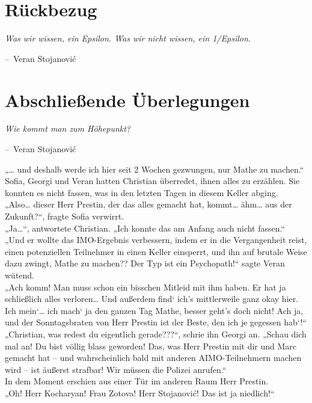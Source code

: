 \documentclass[oneside]{memoir}
\makeatletter
\newenvironment{chapquote}[2][2em]
  {\setlength{\@tempdima}{#1}%
   \def\chapquote@author{#2}%
   \parshape 1 \@tempdima \dimexpr\textwidth-2\@tempdima\relax%
   \itshape}
  {\par\normalfont\hfill--\ \chapquote@author\hspace*{\@tempdima}\par\bigskip}
\makeatother
\begin{document}
\chapter{Rückbezug} %
\begin{chapquote}{Veran Stojanović}
\glqq Was wir wissen, ein Epsilon. Was wir nicht wissen, ein 1/Epsilon.\grqq
\end{chapquote}

\chapter{Abschließende Überlegungen} %
\begin{chapquote}{Veran Stojanović}
\glqq Wie kommt man zum Höhepunkt?\grqq
\end{chapquote}
„\ldots{} und deshalb werde ich hier seit 2 Wochen gezwungen, nur Mathe zu machen.“ \\
Sofia, Georgi und Veran hatten Christian überredet, ihnen alles zu erzählen. Sie konnten es nicht fassen, was in den letzten Tagen in diesem Keller abging. \\
„Also\ldots{} dieser Herr Prestin, der das alles gemacht hat, kommt\ldots{} ähm\ldots{} aus der Zukunft?“, fragte Sofia verwirrt. \\
„Ja\ldots“, antwortete Christian. „Ich konnte das am Anfang auch nicht fassen.“ \\
„Und er wollte das IMO-Ergebnis verbessern, indem er in die Vergangenheit reist, einen potenziellen Teilnehmer in einen Keller einsperrt, und ihn auf brutale Weise dazu zwingt, Mathe zu machen?? Der Typ ist ein Psychopath!“ sagte Veran wütend. \\
„Ach komm! Man muss schon ein bisschen Mitleid mit ihm haben. Er hat ja schließlich alles verloren\ldots{} Und außerdem find‘ ich’s mittlerweile ganz okay hier. Ich mein‘\ldots{} ich mach‘ ja den ganzen Tag Mathe, besser geht’s doch nicht!
Ach ja, und der Sonntagsbraten von Herr Prestin ist der Beste, den ich je gegessen hab‘!“ \\
„Christian, was redest du eigentlich gerade???“, schrie ihn Georgi an. „Schau dich mal an! Du bist völlig blass geworden! Das, was Herr Prestin mit dir und Marc gemacht hat -- und wahrscheinlich bald mit anderen AIMO-Teilnehmern machen wird -- ist äußerst strafbar! Wir müssen die Polizei anrufen.“ \\
In dem Moment erschien aus einer Tür im anderen Raum Herr Prestin. \\
„Oh! Herr Kocharyan! Frau Zotova! Herr Stojanović! Das ist ja niedlich!“ \\
\end{document}
